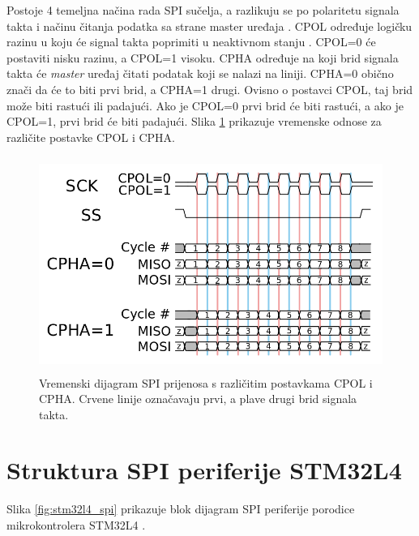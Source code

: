Postoje 4 temeljna načina rada  SPI sučelja, a razlikuju se po polaritetu signala takta  i  načinu čitanja podatka sa strane master uređaja . CPOL određuje logičku razinu u koju će signal takta poprimiti u neaktivnom stanju . CPOL=0 će postaviti nisku razinu, a CPOL=1 visoku. CPHA određuje na koji brid signala takta će \textit{master} uređaj čitati podatak koji se nalazi na liniji. CPHA=0 obično znači da će to biti prvi brid, a CPHA=1 drugi. Ovisno o postavci CPOL, taj brid može biti rastući ili padajući. Ako je CPOL=0 prvi brid će biti rastući, a ako je CPOL=1, prvi brid će biti padajući. Slika \ref{fig:spi_cpol_cpha} prikazuje vremenske odnose za različite postavke CPOL i CPHA.

\begin{figure}[htb]
	\centering
	\includegraphics[height=7cm]{slike/spi_cpol_cpha.png}
	\caption{Vremenski dijagram SPI prijenosa s različitim postavkama CPOL i CPHA. Crvene linije označavaju prvi, a plave drugi brid  signala takta. \cite{spi_wikipedia}}
	\label{fig:spi_cpol_cpha}
\end{figure}

\section{Struktura SPI periferije STM32L4}
Slika \ref{fig:stm32l4_spi} prikazuje blok dijagram SPI periferije porodice mikrokontrolera STM32L4 \cite{stm32l4_manual}.

